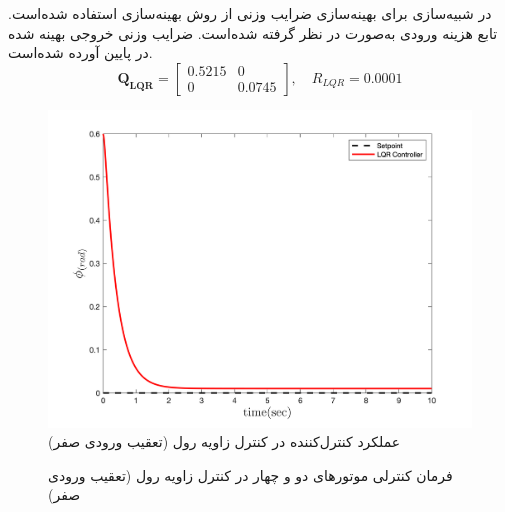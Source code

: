 \documentclass{CCI2020}
\begin{document}
	در شبیه‌سازی برای بهینه‌سازی ضرایب وزنی  از روش بهینه‌سازی
	 \cite{Karimi2010}
	استفاده شده‌است.
	تابع هزینه ورودی  به‌صورت
	در نظر گرفته شده‌است. ضرایب وزنی خروجی بهینه شده در پایین آورده شده‌است.
	\begin{equation}
		\boldsymbol{Q_{LQR}} = \begin{bmatrix}
			0.5215 & 0\\
			0 & 0.0745
		\end{bmatrix}, \quad R_{LQR} =  0.0001
	\end{equation} 
	\begin{figure}[H]
		\includegraphics[width=.48\linewidth]{../Figures/MIL/LQR/Roll/lqr_roll_nn.png}
		\centering
		\caption{عملكرد کنترل‌کننده  در کنترل زاويه رول (تعقیب ورودی صفر)}
		\label{lqr_roll_figure_simulation}
	\end{figure}
	\begin{figure}[H]
		\centering
		\caption{فرمان کنترلی موتورهای دو و چهار در کنترل زاویه رول (تعقیب ورودی صفر)}
	\end{figure}
\end{document}
